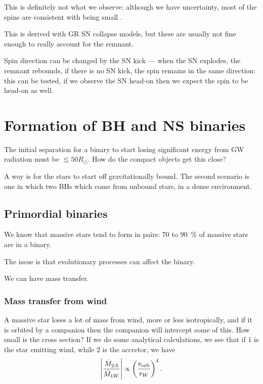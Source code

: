 \documentclass[main.tex]{subfiles}
\begin{document}
This is definitely not what we observe: although we have uncertainty, most of the spins are consistent with being small \cite[]{theligoscientificcollaborationGWTC1GravitationalWaveTransient2019}. 

This is derived with GR SN collapse models, but these are usually not fine enough to really account for the remnant. 

Spin direction can be changed by the SN kick --- when the SN explodes, the remnant rebounds, if there is no SN kick, the spin remains in the same direction: this can be tested, if we observe the SN head-on then we expect the spin to be head-on as well. 

\section{Formation of BH and NS binaries}

The initial separation for a binary to start losing significant energy from GW radiation must be \(\lesssim 50 R_{\odot}\). 
How do the compact objects get this close? 

A way is for the stars to start off gravitationally bound. 
The second scenario is one in which two BHs which come from unbound stars, in a dense environment. 

\subsection{Primordial binaries}

We know that massive stars tend to form in pairs: \num{70} to \SI{90}{\percent} of massive stars are in a binary. 

The issue is that evolutionary processes can affect the binary. 

We can have mass transfer. 
\subsubsection{Mass transfer from wind}

A massive star loses a lot of mass from wind, more or less isotropically, and if it is orbited by a companion then the companion will intercept some of this. 
How small is the cross section? If we do some analytical calculations, we see that if \(1\) is the star emitting wind, while \(2\) is the accretor, we have 
%
\begin{align}
\abs{\frac{\dot{M}_{2A}}{\dot{M}_{1W}}} \propto \qty(\frac{v _{\text{orb}}}{v_W})^{4}
\,.
\end{align}
\end{document}
